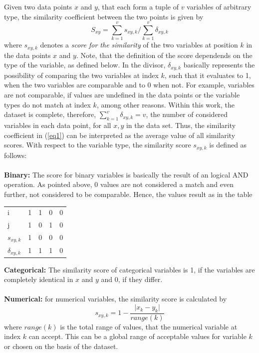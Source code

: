 \documentclass[runningheads]{llncs}
\begin{document}
	Given two data points $x$ and $y$, that each form a tuple of $v$ variables of arbitrary type, the similarity coefficient between the two points is given by
	\begin{equation}\label{eq1}
	S_{xy} = \sum_{k=1}^{v} s_{xy,k} / \sum_{k=1}^{v} \delta_{xy,k} 
	\end{equation} 
	where $s_{xy,k}$ denotes a \textit{score for the similarity} of the two variables at position $k$ in the data points $x$ and $y$. Note, that the definition of the score dependends on the type of the variable, as defined below. In the divisor, $\delta_{xy,k}$ basically represents the possibility of comparing the two variables at index $k$, such that it evaluates to 1, when the two variables are comparable and to 0 when not. For example, variables are not comparable, if values are undefined in the data points or the variable types do not match at index $k$, among other reasons. Within this work, the dataset is complete, therefore, $\sum_{k=1}^{v} \delta_{xy,k}=v$, the number of considered variables in each data point, for all $x, y$ in the data set. Thus, the similarity coefficient in (\ref{eq1}) can be interpreted as the average value of all similarity scores. 
	With respect to the variable type, the similarity score $s_{xy,k}$ is defined as follows:\\
	\\ \textbf{Binary:} The score for binary variables is basically the result of an logical AND operation. As pointed above, 0 values are not considered a match and even further, not considered to be comparable. Hence, the values result as in the table
		\begin{center}
			\begin{tabular}{l | c c c r}
				i & 1 & 1 & 0 & 0 \\
				j & 1 & 0 & 1 & 0 \\
				\hline
				$s_{xy,k}$ & 1 & 0 & 0 & 0 \\
				$\delta_{xy,k}$ & 1 & 1 & 1 & 0
			\end{tabular}
		\end{center}	
	\textbf{Categorical:} The similarity score of categorical variables is 1, if the variables are completely identical in $x$ and $y$ and 0, if they differ.\\
	\\ \textbf{Numerical:} for numerical variables, the similarity score is calculated by
		\begin{equation*}
		s_{xy,k} = 1 - \frac{\vert x_k - y_k \vert}{range(k)}
		\end{equation*}
		where $range(k)$ is the total range of values, that the numerical variable at index $k$ can accept. This can be a global range of acceptable values for variable $k$ or chosen on the basis of the dataset.
\end{document}
